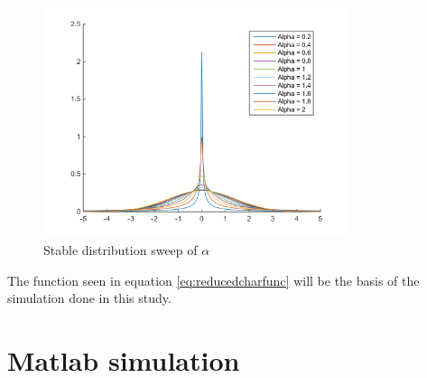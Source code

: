 \begin{figure}[H]
\centering
\includegraphics[width = 0.8\textwidth]{billeder/stblpdfsweep}
\caption{Stable distribution sweep of $\alpha$}
\label{fig:stablepdfsweep}
\end{figure}
The function seen in equation \ref{eq:reducedcharfunc} will be the basis of the simulation done in this study.

\section{Matlab simulation}
 
